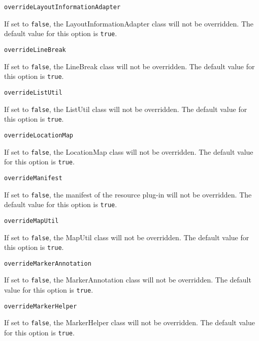 \noindent\texttt{overrideLayoutInformationAdapter}
\begin{myindentpar}{1cm}
If set to \texttt{false}, the LayoutInformationAdapter class will not be overridden. The default value for this option is \texttt{true}.
\end{myindentpar}

\noindent\texttt{overrideLineBreak}
\begin{myindentpar}{1cm}
If set to \texttt{false}, the LineBreak class will not be overridden. The default value for this option is \texttt{true}.
\end{myindentpar}

\noindent\texttt{overrideListUtil}
\begin{myindentpar}{1cm}
If set to \texttt{false}, the ListUtil class will not be overridden. The default value for this option is \texttt{true}.
\end{myindentpar}

\noindent\texttt{overrideLocationMap}
\begin{myindentpar}{1cm}
If set to \texttt{false}, the LocationMap class will not be overridden. The default value for this option is \texttt{true}.
\end{myindentpar}

\noindent\texttt{overrideManifest}
\begin{myindentpar}{1cm}
If set to \texttt{false}, the manifest of the resource plug-in will not be overridden. The default value for this option is \texttt{true}.
\end{myindentpar}

\noindent\texttt{overrideMapUtil}
\begin{myindentpar}{1cm}
If set to \texttt{false}, the MapUtil class will not be overridden. The default value for this option is \texttt{true}.
\end{myindentpar}

\noindent\texttt{overrideMarkerAnnotation}
\begin{myindentpar}{1cm}
If set to \texttt{false}, the MarkerAnnotation class will not be overridden. The default value for this option is \texttt{true}.
\end{myindentpar}

\noindent\texttt{overrideMarkerHelper}
\begin{myindentpar}{1cm}
If set to \texttt{false}, the MarkerHelper class will not be overridden. The default value for this option is \texttt{true}.
\end{myindentpar}

